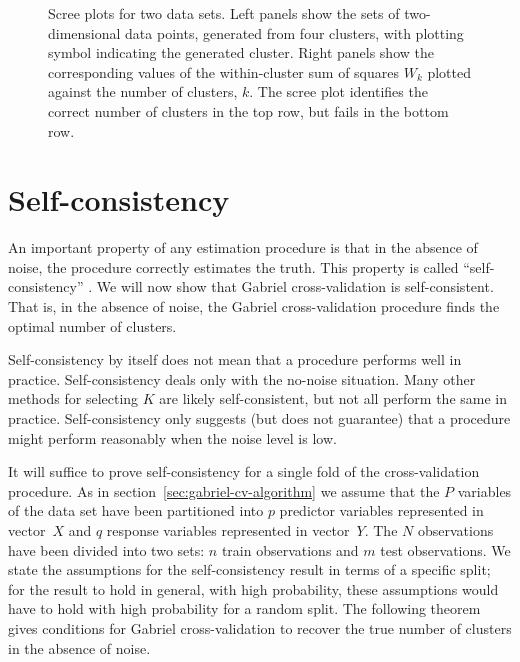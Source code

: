 \documentclass[12pt]{article}
\begin{document}
\begin{figure}
\begin{minipage}{\linewidth}
\begin{minipage}{0.45\linewidth}
  \end{minipage}
\end{minipage}
\caption{Scree plots for two data sets. Left panels show the sets of
    two-dimensional data points, generated from four clusters, with plotting
    symbol indicating the generated cluster. Right panels show the
    corresponding values of the within-cluster sum of squares $W_k$
    plotted against the number of clusters, $k$. The scree plot identifies
    the correct number of clusters in the top row, but fails in the bottom
    row.}
\label{fig:elbow}
\end{figure}


\section{Self-consistency}
\label{sec:self-consistent}

An important property of any estimation procedure is that in the absence of
noise, the procedure correctly estimates the truth. This property is called
``self-consistency'' \citep{tarpey96}. We will now show that Gabriel
cross-validation is self-consistent. That is, in the absence of noise, the
Gabriel cross-validation procedure finds the optimal number of clusters.


Self-consistency by itself does not mean that a procedure performs well in
practice. Self-consistency deals only with the no-noise situation.  Many other
methods for selecting $K$ are likely self-consistent, but not all perform the
same in practice. Self-consistency only suggests (but does not guarantee) that
a procedure might perform reasonably when the noise level is low.


It will suffice to prove self-consistency for a single fold of the
cross-validation procedure.  As in section~\ref{sec:gabriel-cv-algorithm} we
assume that the $P$ variables of the data set have been partitioned into $p$
predictor variables represented in vector~$X$ and $q$ response variables
represented in vector~$Y$.  The $N$ observations have been divided into two
sets: $n$ train observations and $m$ test observations.  We state the
assumptions for the self-consistency result in terms of a specific split; for
the result to hold in general, with high probability, these assumptions would
have to hold with high probability for a random split. The following theorem
gives conditions for Gabriel cross-validation to recover the true number of
clusters in the absence of noise.
\end{document}
